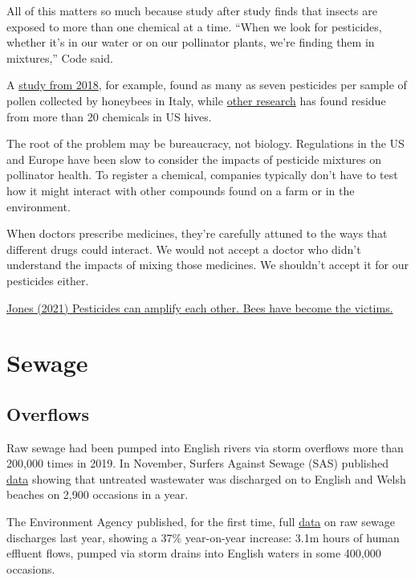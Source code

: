 \documentclass[
]{book}
\begin{document}
All of this matters so much because study after study finds that insects are exposed to more than one chemical at a time. ``When we look for pesticides, whether it's in our water or on our pollinator plants, we're finding them in mixtures,'' Code said.

A \href{https://pubmed.ncbi.nlm.nih.gov/28968582/}{study from 2018}, for example, found as many as seven pesticides per sample of pollen collected by honeybees in Italy, while \href{https://www.sciencedirect.com/science/article/abs/pii/S0269749121001445\#}{other research} has found residue from more than 20 chemicals in US hives.

The root of the problem may be bureaucracy, not biology. Regulations in the US and Europe have been slow to consider the impacts of pesticide mixtures on pollinator health. To register a chemical, companies typically don't have to test how it might interact with other compounds found on a farm or in the environment.

When doctors prescribe medicines, they're carefully attuned to the ways that different drugs could interact. We would not accept a doctor who didn't understand the impacts of mixing those medicines. We shouldn't accept it for our pesticides either.

\href{https://www.vox.com/22612979/pesticide-mixtures-kill-bees-insects-pollinators}{Jones (2021) Pesticides can amplify each other. Bees have become the victims.}

\hypertarget{sewage}{%
\section{Sewage}\label{sewage}}

\hypertarget{overflows}{%
\subsection{Overflows}\label{overflows}}

Raw sewage had been pumped into English rivers via storm overflows more than 200,000 times in 2019. In November, Surfers Against Sewage (SAS) published \href{https://www.theguardian.com/environment/2020/nov/06/raw-sewage-dumped-into-english-and-welsh-beaches-2900-times-this-year}{data} showing that untreated wastewater was discharged on to English and Welsh beaches on 2,900 occasions in a year.

The Environment Agency published, for the first time, full \href{https://www.theguardian.com/environment/2021/mar/31/water-firms-discharged-raw-sewage-into-english-waters-400000-times-last-year}{data} on raw sewage discharges last year, showing a 37\% year-on-year increase: 3.1m hours of human effluent flows, pumped via storm drains into English waters in some 400,000 occasions.
\end{document}
